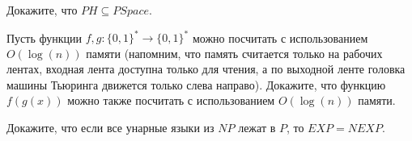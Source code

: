 \begin{task}
    Докажите, что $PH \subseteq PSpace$.
\end{task}

\begin{task}
    Пусть функции $f, g: \{0, 1\}^* \rightarrow \{0, 1\}^*$ можно посчитать с
    использованием $O(\log(n))$ памяти (напомним, что память считается только на
    рабочих лентах, входная лента доступна только для чтения, а по выходной ленте
    головка машины Тьюринга движется только слева направо). Докажите, что функцию
    $f(g(x))$ можно также посчитать с использованием $O(\log(n))$ памяти.
\end{task}

\begin{task}
	Докажите, что если все унарные языки из $NP$ лежат в $P$, то $EXP = NEXP$.
\end{task}
